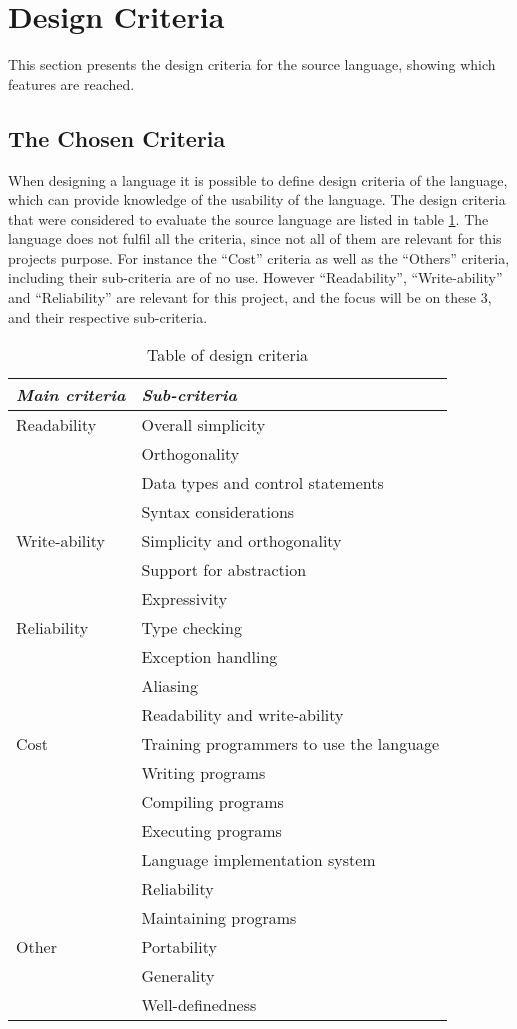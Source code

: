 \section{Design Criteria}\label{chap:design-criteria}
This section presents the design criteria for the source language, showing which features are reached. 

\subsection{The Chosen Criteria}
When designing a language it is possible to define design criteria of the language, which can provide knowledge of the usability of the language. The design criteria that were considered to evaluate the source language are listed in table \ref{chap:design-criteria}. The language does not fulfil all the criteria, since not all of them are relevant for this projects purpose. For instance the ``Cost'' criteria as well as the ``Others'' criteria, including their sub-criteria are of no use. However ``Readability'', ``Write-ability'' and ``Reliability'' are relevant for this project, and the focus will be on these 3, and their respective sub-criteria.

\begin{table}[H]
	\center
	\begin{tabular}{|l|l|}
	\hline
	\emph{Main criteria} & \emph{Sub-criteria} \\ 
 		\hline
 		Readability & Overall simplicity \\
 		 & Orthogonality \\
 		 & Data types and control statements \\
 		 & Syntax considerations \\
 		\hline
 		Write-ability & Simplicity and orthogonality  \\
 		 & Support for abstraction \\
 		 & Expressivity \\
 		\hline
 		Reliability & Type checking \\
 		 & Exception handling \\
 		 & Aliasing \\
 		 & Readability and write-ability \\
 		\hline
 		Cost & Training programmers to use the language \\
 		 & Writing programs \\
 		 & Compiling programs \\
 		 & Executing programs \\
 		 & Language implementation system \\
 		 & Reliability \\
 		 & Maintaining programs \\
 		\hline
 		Other & Portability \\
 		 & Generality \\
 		 & Well-definedness \\
 		\hline
	\end{tabular}
	\label{tab:design}
	\caption{Table of design criteria}
\end{table} 

